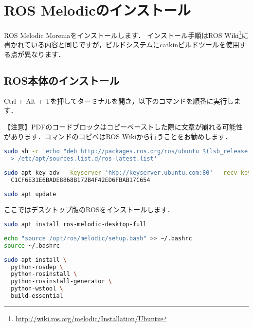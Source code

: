 \documentclass[{../../master}]{subfiles}
\begin{document}
\section{ROS Melodicのインストール}

ROS Melodic Moreniaをインストールします．
インストール手順はROS Wiki\footnote{\url{http://wiki.ros.org/melodic/Installation/Ubuntu}}に書かれている内容と同じですが，ビルドシステムに\textsf{catkin}ビルドツールを使用する点が異なります．

\subsection{ROS本体のインストール}

\textsf{Ctrl + Alt + T}を押してターミナルを開き，以下のコマンドを順番に実行します．

\noindent
【注意】PDFのコードブロックはコピーペーストした際に文章が崩れる可能性があります．コマンドのコピペはROS Wikiから行うことをお勧めします．

\begin{lstlisting}[language=sh, caption=リポジトリの鍵の取得]
sudo sh -c 'echo "deb http://packages.ros.org/ros/ubuntu $(lsb_release -sc) main" \
  > /etc/apt/sources.list.d/ros-latest.list'
\end{lstlisting}

\begin{lstlisting}[language=sh, caption=鍵の登録]
sudo apt-key adv --keyserver 'hkp://keyserver.ubuntu.com:80' --recv-key \
  C1CF6E31E6BADE8868B172B4F42ED6FBAB17C654
\end{lstlisting}

\begin{lstlisting}[language=sh, caption=パッケージリストのアップデート]
sudo apt update
\end{lstlisting}

ここではデスクトップ版のROSをインストールします．

\begin{lstlisting}[language=sh, caption=ROS本体のインストール]
sudo apt install ros-melodic-desktop-full
\end{lstlisting}

\begin{lstlisting}[language=sh, caption=ROSのセットアップスクリプトの読み込みを自動化する]
echo "source /opt/ros/melodic/setup.bash" >> ~/.bashrc
source ~/.bashrc
\end{lstlisting}

\begin{lstlisting}[language=sh, caption=ユーティリティツールのインストール]
sudo apt install \
  python-rosdep \
  python-rosinstall \
  python-rosinstall-generator \
  python-wstool \
  build-essential
\end{lstlisting}
\end{document}
